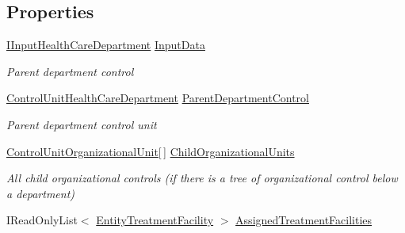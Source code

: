 \subsection*{Properties}
\begin{DoxyCompactItemize}
\item 
\hyperlink{interface_general_health_care_elements_1_1_input_1_1_i_input_health_care_department}{I\+Input\+Health\+Care\+Department} \hyperlink{class_general_health_care_elements_1_1_control_units_1_1_control_unit_organizational_unit_a50637ef02290149a07378cbe89c369fe}{Input\+Data}
\begin{DoxyCompactList}\small\item\em Parent department control \end{DoxyCompactList}\item 
\hyperlink{class_general_health_care_elements_1_1_control_units_1_1_control_unit_health_care_department}{Control\+Unit\+Health\+Care\+Department} \hyperlink{class_general_health_care_elements_1_1_control_units_1_1_control_unit_organizational_unit_afa29f4d91214c9c7421ed71307a0b792}{Parent\+Department\+Control}
\begin{DoxyCompactList}\small\item\em Parent department control unit \end{DoxyCompactList}\item 
\hyperlink{class_general_health_care_elements_1_1_control_units_1_1_control_unit_organizational_unit}{Control\+Unit\+Organizational\+Unit}\mbox{[}$\,$\mbox{]} \hyperlink{class_general_health_care_elements_1_1_control_units_1_1_control_unit_organizational_unit_a5eb9910659ae60ac374271113d88b8e5}{Child\+Organizational\+Units}
\begin{DoxyCompactList}\small\item\em All child organizational controls (if there is a tree of organizational control below a department) \end{DoxyCompactList}\item 
I\+Read\+Only\+List$<$ \hyperlink{class_general_health_care_elements_1_1_entities_1_1_entity_treatment_facility}{Entity\+Treatment\+Facility} $>$ \hyperlink{class_general_health_care_elements_1_1_control_units_1_1_control_unit_organizational_unit_a3d65a6b95f634b08976ed2079be1662d}{Assigned\+Treatment\+Facilities}

\end{DoxyCompactItemize}
